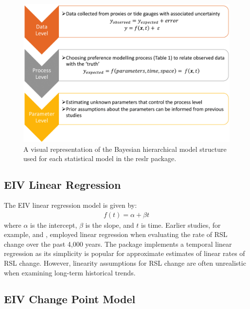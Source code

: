 \begin{figure}

{\centering \includegraphics[width=0.5\linewidth]{figures/hierarchical_model_def} 

}

\caption{A visual representation of the Bayesian hierarchical model structure used for each statistical model in the reslr package.}\label{fig:dag}
\end{figure}

\subsection{EIV Linear Regression}\label{linearregression}

The EIV linear regression model is given by:
\begin{align}
f(t) = \alpha + \beta t
\end{align}
where \(\alpha\) is the intercept, \(\beta\) is the slope, and \(t\) is time. Earlier studies, for example, \citet{Shennan2002} and \citet{Engelhart2009}, employed linear regression when evaluating the rate of RSL change over the past 4,000 years. The  package implements a temporal linear regression as its simplicity is popular for approximate estimates of linear rates of RSL change. However, linearity assumptions for RSL change are often unrealistic when examining long-term historical trends.

\subsection{EIV Change Point Model}\label{changepointmodel}

